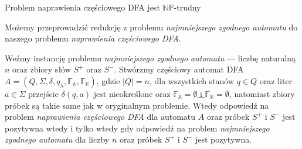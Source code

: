 \documentclass[10pt, aspectratio=169]{beamer}
\begin{document}
\begin{frame}{}
    
\end{frame}


\begin{frame}

\begin{block}{Problem naprawienia częściowego DFA jest $\mathbb{NP}$-trudny}

Możemy przeprowadzić redukcję z problemu \textit{najmniejszego zgodnego automatu} do naszego problemu \textit{naprawienia częściowego DFA}. 

Weźmy instancję problemu \textit{najmniejszego zgodnego automatu} --- liczbę naturalną $n$ oraz zbiory słów $S^+$ oraz $S^-$. Stwórzmy częściowy automat DFA $A = (Q, \Sigma, \delta, q_\lambda, \mathbb{F_A}, \mathbb{F_R})$, gdzie $|Q| = n$,
dla wszystkich stanów $q \in Q$ oraz liter $a \in \Sigma$ przejście $\delta(q, a)$ jest nieokreślone oraz \underline{$\mathbb{F_A} = \emptyset$ i $\mathbb{F_R} = \emptyset$},
natomiast zbiory próbek są takie same jak w oryginalnym problemie.
Wtedy odpowiedź na problem \textit{naprawienia częściowego DFA} dla automatu $A$ oraz próbek $S^+$ i $S^-$ jest pozytywna wtedy i tylko wtedy gdy odpowiedź na problem \textit{najmniejszego zgodnego automatu} dla liczby $n$ oraz próbek $S^+$ i $S^-$ jest pozytywna.
\end{block}

\end{frame}
\end{document}
